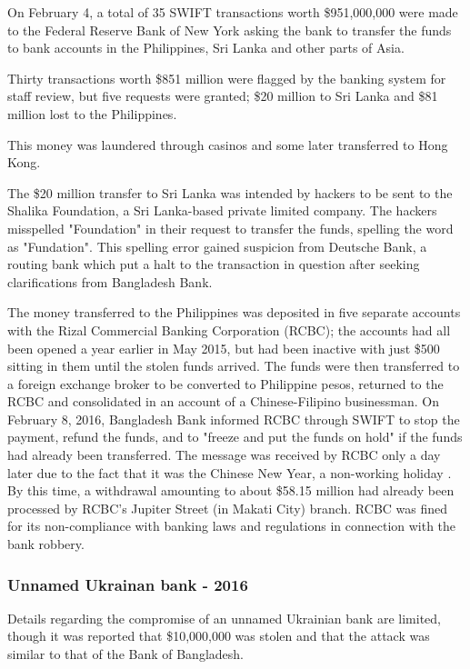 \documentclass[12pt]{article}
\begin{document}
        On February 4, a total of 35 SWIFT transactions worth \$951,000,000 were made to the Federal Reserve Bank of New York asking the bank to transfer the funds to bank accounts in the Philippines, Sri Lanka and other parts of Asia. 
        
        Thirty transactions worth \$851 million were flagged by the banking system for staff review, but five requests were granted; \$20 million to Sri Lanka and \$81 million lost to the Philippines. 
        
        This money was laundered through casinos and some later transferred to Hong Kong. 
        
        The \$20 million transfer to Sri Lanka was intended by hackers to be sent to the Shalika Foundation, a Sri Lanka-based private limited company. The hackers misspelled "Foundation" in their request to transfer the funds, spelling the word as "Fundation". This spelling error gained suspicion from Deutsche Bank, a routing bank which put a halt to the transaction in question after seeking clarifications from Bangladesh Bank.
        
        The money transferred to the Philippines was deposited in five separate accounts with the Rizal Commercial Banking Corporation (RCBC); the accounts had all been opened a year earlier in May 2015, but had been inactive with just \$500 sitting in them until the stolen funds arrived. The funds were then transferred to a foreign exchange broker to be converted to Philippine pesos, returned to the RCBC and consolidated in an account of a Chinese-Filipino businessman. On February 8, 2016, Bangladesh Bank informed RCBC through SWIFT to stop the payment, refund the funds, and to "freeze and put the funds on hold" if the funds had already been transferred. The message was received by RCBC only a day later due to the fact that it was the Chinese New Year, a non-working holiday . By this time, a withdrawal amounting to about \$58.15 million had already been processed by RCBC's Jupiter Street (in Makati City) branch. RCBC was fined for its non-compliance with banking laws and regulations in connection with the bank robbery.\cite{TwoBytes951m}\cite{UnitedStatesAmerica}\cite{SWIFTThreatAnalysis}
    
    \subsubsection{Unnamed Ukrainan bank - 2016}
        Details regarding the compromise of an unnamed Ukrainian bank are limited, though it was reported that \$10,000,000 was stolen and that the attack was similar to that of the Bank of Bangladesh. 
        
\end{document}
